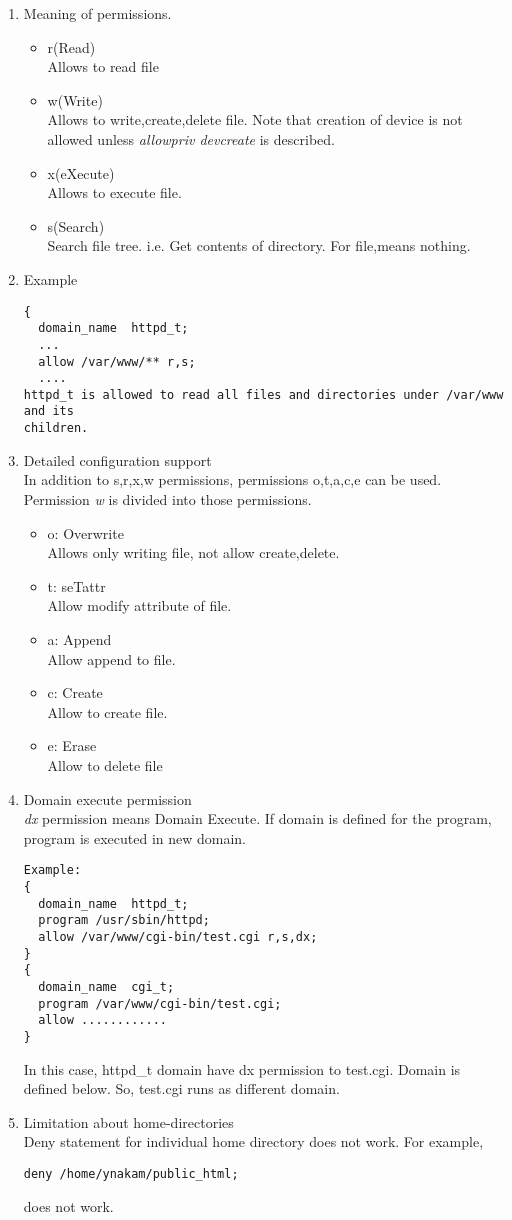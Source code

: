 \documentclass{article}
\begin{document}
\begin{enumerate}
  \item Meaning of permissions.
  \begin{itemize}
   \item r(Read)\\
	 Allows to read file
   \item w(Write)\\
	 Allows to write,create,delete file. Note that creation of
	 device is not allowed unless {\it allowpriv devcreate} is described.
   \item x(eXecute)\\
	 Allows to execute file.
   \item s(Search)\\ 
	 Search file tree. i.e. Get contents of directory. For file,means nothing.
  \end{itemize}
  \item Example
\begin{verbatim}
{
  domain_name  httpd_t;
  ...
  allow /var/www/** r,s;
  ....
httpd_t is allowed to read all files and directories under /var/www and its 
children.
\end{verbatim}
  \item Detailed configuration support\\
	In addition to s,r,x,w permissions, permissions o,t,a,c,e
	can be used. Permission {\it w} is divided into those
	permissions.\\
	\begin{itemize}
	 \item o: Overwrite\\
	       Allows only writing file, not allow create,delete.
	 \item t: seTattr\\
	       Allow modify attribute of file.
	 \item a: Append\\
	       Allow append to file.
	 \item c: Create\\
	       Allow to create file.
	 \item e: Erase\\
	       Allow to delete file  
	\end{itemize}
  \item Domain execute permission\\
	{\it dx} permission means Domain Execute. If domain is defined
	for the program, program is executed in new domain.
	\begin{verbatim}
Example:
{
  domain_name  httpd_t;
  program /usr/sbin/httpd;
  allow /var/www/cgi-bin/test.cgi r,s,dx;
}
{
  domain_name  cgi_t;
  program /var/www/cgi-bin/test.cgi;
  allow ............
}
\end{verbatim}
	In this case, httpd\_t domain have dx permission to
	test.cgi. Domain is defined below. So, test.cgi runs as
	different domain.           
  \item Limitation about home-directories\\
	Deny statement for individual home directory does not work.
	For example,
	\begin{verbatim}
deny /home/ynakam/public_html;
	\end{verbatim}
does not work.


\end{enumerate}
\end{document}
